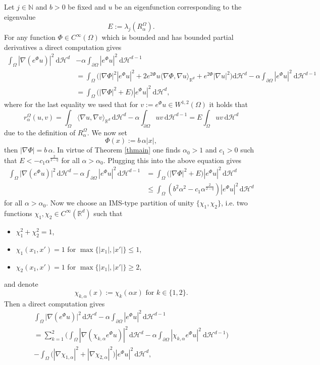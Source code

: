 \documentclass[11pt,oneside,reqno,a4paper]{amsart}
\newcommand{\dd}{\mathrm{d}}
\newcommand{\N}{\mathbb{N}}
\newcommand{\R}{\mathbb{R}}
\renewcommand{\H}{\mathcal{H}}
\theoremstyle{definition}
\begin{document}
Let $j\in\N$ and $b>0$ be fixed and $u$ be an eigenfunction corresponding to the eigenvalue
\[
E:=\lambda_j(R_\alpha^\Omega).
\]
For any function $\Phi\in C^\infty(\Omega)$ which is bounded and has bounded partial derivatives a direct computation gives
\begin{align*}
\int_\Omega|\nabla(e^{\Phi}u)|^2\ \dd \H^d&-\alpha\int_{\partial\Omega}|e^{\Phi}u|^2\ \dd \H^{d-1}
\\
&=\int_\Omega \big( |\nabla \Phi|^2 |e^{\Phi} u|^2+2e^{2\Phi}u\langle\nabla\Phi,\nabla u\rangle_{\R^d}+e^{2\Phi}|\nabla u|^2\big) \dd \H^d-\alpha\int_{\partial\Omega}|e^{\Phi}u|^2\ \dd \H^{d-1}
\\
&=\int_\Omega \big(|\nabla\Phi|^2+E\big)|e^\Phi u|^2\ \dd \H^d,
\end{align*}
where for the last equality we used that for $v:=e^{\Phi}u\in W^{1,2}(\Omega)$ it holds that
\[
r_\alpha^\Omega(u,v)=\int_\Omega \langle \nabla u,\nabla v\rangle_{\R^d}\, \dd \H^d-\alpha\int_{\partial\Omega}uv\, \dd \H^{d-1}=E\int_{\Omega}uv\, \dd \H^d
\]
due to the definition of $R^\Omega_\alpha$. We now set
\[
\Phi(x):=b\, \alpha|x|,
\]
then
$|\nabla\Phi|=b\, \alpha$. In virtue of Theorem \ref{thmain} one finds
$\alpha_0>1$ and $c_1>0$ such that $E<-c_1\alpha^{\frac{2}{2-q}}$ for all $\alpha>\alpha_0$. Plugging this into the above equation gives
\begin{equation}
	\label{agm1}
\begin{aligned}
\int_\Omega\big|\nabla(e^{\Phi}u)\big|^2\, \dd \H^d-\alpha\int_{\partial\Omega}|e^{\Phi}u|^2\, \dd \H^{d-1}&=\int_\Omega \big(|\nabla\Phi|^2+E\big)|e^\Phi u|^2\, \dd \H^d\\
&\le \int_\Omega (b^2\alpha^2-c_1\alpha^{\frac{2}{2-q}})|e^{\Phi}u|^2\, \dd \H^d
\end{aligned}
\end{equation}
for all $\alpha>\alpha_0$. Now we choose an IMS-type partition of unity $\{\chi_1,\chi_2\}$, i.e. two functions $\chi_1,\chi_2\in C^\infty(\R^d)$ such that
\begin{itemize}
	\item $\chi^2_1+\chi_2^2=1$,
	\item $\chi_1(x_1,x')=1$ for $\max\big\{|x_1|,|x'|\big\}\le 1$,
	\item $\chi_2(x_1,x')=1$ for $\max\big\{|x_1|,|x'|\big\}\ge 2$,
\end{itemize}
and denote
\[
\chi_{k,\alpha}(x):=\chi_k(\alpha x) \text{ for }k\in\{1,2\}.
\]
Then a direct computation gives
\begin{multline*}
	\int_\Omega\big|\nabla(e^{\Phi}u)\big|^2\, \dd \H^d-\alpha\int_{\partial\Omega}|e^{\Phi}u|^2\, \dd \H^{d-1}\\
	=\sum_{k=1}^2\Big(\int_{\Omega}|\nabla(\chi_{k,\alpha}e^{\Phi}u)|^2\, \dd \H^d-\alpha\int_{\partial\Omega}|\chi_{k,\alpha}e^{\Phi}u|^2\ \dd \H^{d-1}\Big)
	\\-\int_\Omega \big(|\nabla \chi_{1,\alpha}|^2+|\nabla \chi_{2,\alpha}|^2\big)|e^\Phi u|^2\,\dd \H^d,
\end{multline*}
\end{document}
